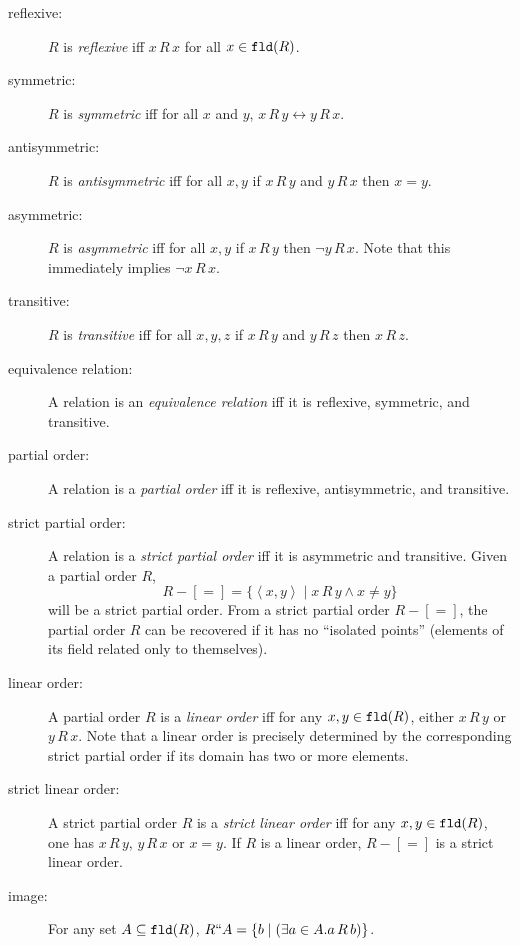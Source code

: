 \documentclass[12pt]{book}
\begin{document}
\begin{description}

\item [reflexive:] $R$ is {\em reflexive\/} iff $x\,R\,x$ for all $x \in {\tt fld}(R)$.

\item[symmetric:]  $R$ is {\em symmetric\/} iff for all $x$ and $y$, $x\,R\,y \leftrightarrow y\,R\,x$.

\item[antisymmetric:]  $R$ is {\em antisymmetric\/} iff for all $x,y$ if $x\,R\,y$ and $y\,R\,x$ then $x=y$.

\item[asymmetric:] $R$ is {\em asymmetric\/} iff for all $x,y$ if $x\,R\,y$
then $\neg y \,R\,x$.  Note that this immediately implies $\neg x\,R\,x$.

\item[transitive:]  $R$ is {\em transitive\/} iff for all $x,y,z$ if $x\,R\,y$ and $y\,R\,z$ then $x\,R\,z$.

\item[equivalence relation:]  A relation is an {\em equivalence relation\/} iff it is reflexive, symmetric, and transitive.

\item[partial order:] A relation is a {\em partial order\/} iff it is
reflexive, antisymmetric, and transitive.

\item[strict partial order:] A relation is a {\em strict partial order\/} iff
it is asymmetric and transitive.  Given a partial order $R$, $$R-[=]=\{\left<x,y\right> \mid x\,R\,y \wedge x \neq y\}$$
will be a strict partial order.  From a strict partial order $R-[=]$,
the partial order $R$ can be recovered if it has  no ``isolated
points'' (elements of its field related only to themselves).

\item[linear order:] A partial order $R$ is a {\em linear order\/} iff
for any $x,y \in {\tt fld}(R)$, either $x \,R\,y$ or $y\,R\,x$.  Note
that a linear order is precisely determined by the corresponding
strict partial order if its domain has two or more elements.

\item[strict linear order:] A strict partial order $R$ is a {\em strict
linear order\/} iff for any $x,y \in {\tt fld}(R)$, one has $x\,R\,y$,
$y\,R\,x$ or $x=y$.  If $R$ is a linear order, $R-[=]$ is a strict
linear order.

\item[image:]  For any set $A\subseteq {\tt fld}(R)$, $R``A = \{b \mid (\exists a \in A.a\,R\,b)\}$.


\end{description}
\end{document}
